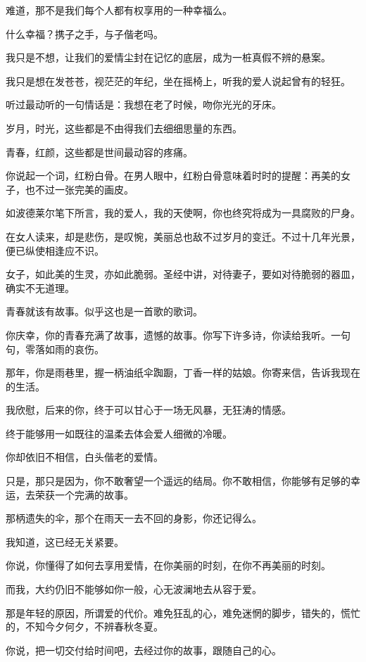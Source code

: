 \documentclass[12pt,a4paper]{article}
\begin{document}
		难道，那不是我们每个人都有权享用的一种幸福么。\par
		什么幸福？携子之手，与子偕老吗。\par
		我只是不想，让我们的爱情尘封在记忆的底层，成为一桩真假不辨的悬案。\par
		我只是想在发苍苍，视茫茫的年纪，坐在摇椅上，听我的爱人说起曾有的轻狂。\par
		听过最动听的一句情话是：我想在老了时候，吻你光光的牙床。

		岁月，时光，这些都是不由得我们去细细思量的东西。\par
		青春，红颜，这些都是世间最动容的疼痛。

		你说起一个词，红粉白骨。在男人眼中，红粉白骨意味着时时的提醒：再美的女子，也不过一张完美的画皮。\par
		如波德莱尔笔下所言，我的爱人，我的天使啊，你也终究将成为一具腐败的尸身。\par
		在女人读来，却是悲伤，是叹惋，美丽总也敌不过岁月的变迁。不过十几年光景，便已纵使相逢应不识。\par
		女子，如此美的生灵，亦如此脆弱。圣经中讲，对待妻子，要如对待脆弱的器皿，确实不无道理。

		青春就该有故事。似乎这也是一首歌的歌词。\par
		你庆幸，你的青春充满了故事，遗憾的故事。你写下许多诗，你读给我听。一句句，零落如雨的哀伤。\par
		那年，你是雨巷里，握一柄油纸伞踟蹰，丁香一样的姑娘。你寄来信，告诉我现在的生活。\par
		我欣慰，后来的你，终于可以甘心于一场无风暴，无狂涛的情感。\par
		终于能够用一如既往的温柔去体会爱人细微的冷暖。\par
		你却依旧不相信，白头偕老的爱情。\par
		只是，那只是因为，你不敢奢望一个遥远的结局。你不敢相信，你能够有足够的幸运，去荣获一个完满的故事。\par
		那柄遗失的伞，那个在雨天一去不回的身影，你还记得么。\par
		我知道，这已经无关紧要。\par
		你说，你懂得了如何去享用爱情，在你美丽的时刻，在你不再美丽的时刻。

		而我，大约仍旧不能够如你一般，心无波澜地去从容于爱。\par
		那是年轻的原因，所谓爱的代价。难免狂乱的心，难免迷惘的脚步，错失的，慌忙的，不知今夕何夕，不辨春秋冬夏。\par
		你说，把一切交付给时间吧，去经过你的故事，跟随自己的心。
\end{document}
